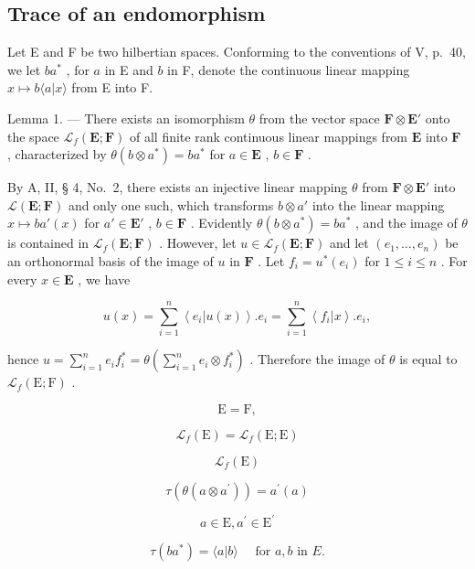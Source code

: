 \subsection{Trace of an endomorphism}

Let E and F be two hilbertian spaces. Conforming to the conventions of V, p.~40, we let \(ba^{*}\) , for \(a\) in E and \(b\) in F, denote the continuous linear mapping \(x \mapsto b \langle a|x\rangle\) from E into F.

Lemma 1. --- There exists an isomorphism \(\theta\) from the vector space \(\mathbf{F} \otimes \mathbf{E}'\) onto the space \(\mathcal{L}_f(\mathbf{E}; \mathbf{F})\) of all finite rank continuous linear mappings from \(\mathbf{E}\) into \(\mathbf{F}\) , characterized by \(\theta(b \otimes a^*) = ba^*\) for \(a \in \mathbf{E}\) , \(b \in \mathbf{F}\) .

By A, II, § 4, No.~2, there exists an injective linear mapping \(\theta\) from \(\mathbf{F} \otimes \mathbf{E}'\) into \(\mathcal{L}(\mathbf{E};\mathbf{F})\) and only one such, which transforms \(b \otimes a'\) into the linear mapping \(x \mapsto ba'(x)\) for \(a' \in \mathbf{E}'\) , \(b \in \mathbf{F}\) . Evidently \(\theta(b \otimes a^*) = ba^*\) , and the image of \(\theta\) is contained in \(\mathcal{L}_f(\mathbf{E};\mathbf{F})\) . However, let \(u \in \mathcal{L}_f(\mathbf{E};\mathbf{F})\) and let \((e_1,\dots,e_n)\) be an orthonormal basis of the image of \(u\) in \(\mathbf{F}\) . Let \(f_i = u^*(e_i)\) for \(1 \leqslant i \leqslant n\) . For every \(x \in \mathbf{E}\) , we have

\[
u (x) = \sum_ {i = 1} ^ {n} \left\langle e _ {i} | u (x) \right\rangle . e _ {i} = \sum_ {i = 1} ^ {n} \left\langle f _ {i} | x \right\rangle . e _ {i},
\]

hence \(u = \sum_{i=1}^{n} e_i f_i^* = \theta(\sum_{i=1}^{n} e_i \otimes f_i^*)\) . Therefore the image of \(\theta\) is equal to \(\mathcal{L}_f(\mathrm{E};\mathrm{F})\) .

\[
\mathrm{E} = \mathrm{F},
\]

\[
\mathscr {L} _ {f} (\mathrm{E}) = \mathscr {L} _ {f} (\mathrm{E}; \mathrm{E})
\]

\[
\mathcal {L} _ {f} (\mathrm{E})
\]

\[
\tau (\theta (a \otimes a ^ {\prime})) = a ^ {\prime} (a)
\]

\[
a \in \mathrm{E}, a ^ {\prime} \in \mathrm{E} ^ {\prime}\tag{22}
\]

\[
\tau (b a ^ {*}) = \langle a | b \rangle \quad \text { for } a, b \text { in } E.
\]

